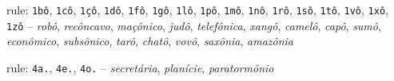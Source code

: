 \begin{rules}

\item\label{rulegrp_bo} rule: \texttt{1bô}, \texttt{1cô}, \texttt{1çô}, \texttt{1dô}, \texttt{1fô}, \texttt{1gô}, \texttt{1lô}, \texttt{1pô}, \texttt{1mô}, \texttt{1nô}, \texttt{1rô}, \texttt{1sô}, \texttt{1tô}, \texttt{1vô}, \texttt{1xô}, \texttt{1zô} -- \emph{robô}, \emph{recôncavo}, \emph{maçônico}, \emph{judô}, \emph{telefônica}, \emph{xangô}, \emph{camelô}, \emph{capô}, \emph{sumô}, \emph{econômico}, \emph{subsônico}, \emph{tarô}, \emph{chatô}, \emph{vovô}, \emph{saxônia}, \emph{amazônia}

\item\label{rulegrp_Vf} rule: \texttt{4a.}, \texttt{4e.}, \texttt{4o.} -- \emph{secretária}, \emph{planície}, \emph{paratormônio}








\end{rules}
